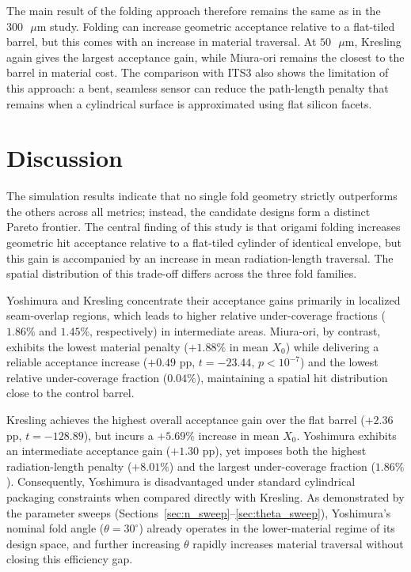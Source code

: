 \documentclass[a4paper,11pt]{article}
\begin{document}
The main result of the folding approach therefore remains the same as in the $300\text{ }\mu\text{m}$ study. Folding can increase geometric acceptance relative to a flat-tiled barrel, but this comes with an increase in material traversal. At $50\text{ }\mu\text{m}$, Kresling again gives the largest acceptance gain, while Miura-ori remains the closest to the barrel in material cost. The comparison with ITS3 also shows the limitation of this approach: a bent, seamless sensor can reduce the path-length penalty that remains when a cylindrical surface is approximated using flat silicon facets.

\FloatBarrier
\section{Discussion}
\label{sec:discussion}
The simulation results indicate that no single fold geometry strictly outperforms the others across all metrics; instead, the candidate designs form a distinct Pareto frontier. The central finding of this study is that origami folding increases geometric hit acceptance relative to a flat-tiled cylinder of identical envelope, but this gain is accompanied by an increase in mean radiation-length traversal. The spatial distribution of this trade-off differs across the three fold families.

Yoshimura and Kresling concentrate their acceptance gains primarily in localized seam-overlap regions, which leads to higher relative under-coverage fractions ($1.86\%$ and $1.45\%$, respectively) in intermediate areas. Miura-ori, by contrast, exhibits the lowest material penalty ($+1.88\%$ in mean $X_0$) while delivering a reliable acceptance increase ($+0.49$ pp, $t = -23.44$, $p < 10^{-7}$) and the lowest relative under-coverage fraction ($0.04\%$), maintaining a spatial hit distribution close to the control barrel.

Kresling achieves the highest overall acceptance gain over the flat barrel ($+2.36$ pp, $t = -128.89$), but incurs a $+5.69\%$ increase in mean $X_0$. Yoshimura exhibits an intermediate acceptance gain ($+1.30$ pp), yet imposes both the highest radiation-length penalty ($+8.01\%$) and the largest under-coverage fraction ($1.86\%$). Consequently, Yoshimura is disadvantaged under standard cylindrical packaging constraints when compared directly with Kresling. As demonstrated by the parameter sweeps (Sections~\ref{sec:n_sweep}--\ref{sec:theta_sweep}), Yoshimura's nominal fold angle ($\theta = 30^\circ$) already operates in the lower-material regime of its design space, and further increasing $\theta$ rapidly increases material traversal without closing this efficiency gap.
\end{document}
